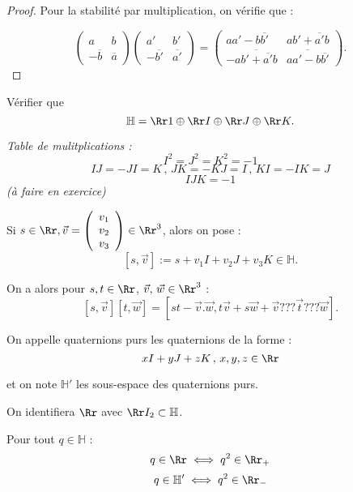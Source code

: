 \documentclass[class=report,crop=false]{standalone}
\newcommand{\exoo}{\emph{(à faire en exercice)}}
\newcommand{\Hh}{\mathbb{H}}
\begin{document}
\begin{proof}
Pour la stabilité par multiplication, on vérifie que :

\[\left(\begin{array}{cc}
a & b\\
-\overline{b} & \overline{a}
\end{array}\right)\left(\begin{array}{cc}
a' & b'\\
-\overline{b'} & \overline{a'}
\end{array}\right) = \left(\begin{array}{cc}
aa'-b\overline{b'} & ab'+\overline{a'}b\\
-\overline{ab'+\overline{a'}b} & \overline{aa'-b\overline{b'}}
\end{array}\right) .\]
\end{proof}

\begin{exercicecours}
Vérifier que \[\Hh = \Rr1 \oplus \Rr I \oplus \Rr J \oplus \Rr K .\]
\end{exercicecours}

{\it Table de mulitplications :}
\[I^2 = J^2 = K^2 = -1\]
\[IJ=-JI = K\,,\, JK = -KJ = I \,,\, KI = -IK = J\]
\[IJK = -1\]
\exoo

\begin{remarque*}
Si $s \in \Rr,\vec{v}=\left(\begin{array}{c}
v_1\\
v_2\\
v_3
\end{array}\right)\in \Rr^3$, alors on pose :
\[[s,\vec{v}] := s+v_1I+v_2J+v_3K \in\Hh
 .\]

On a alors pour $s,t \in \Rr$, $\vec{v},\,\vec{w}\in\Rr^3$ :
\[[s,\vec{v}][t,\vec{w}] = [st-\vec{v}.\vec{w},t\vec{v} + s\vec{w} +\vec{v}???\vec{t}??? \vec{w}] .\]
\end{remarque*}

\begin{definition}
On appelle quaternions purs  les quaternions de la forme :
\[xI + y J + z K \,,\, x,y,z \in \Rr\]

et on note $\Hh'$ les sous-espace des quaternions purs.
\end{definition}

On identifiera  $\Rr$ avec $\Rr I_2 \subset \Hh$.

\begin{exercicecours}
Pour tout $q \in \Hh$ :
\[q \in \Rr \iff q^2 \in \Rr_+\]
\[q \in \Hh' \iff q^2 \in \Rr_-\]
\end{exercicecours}
\end{document}
